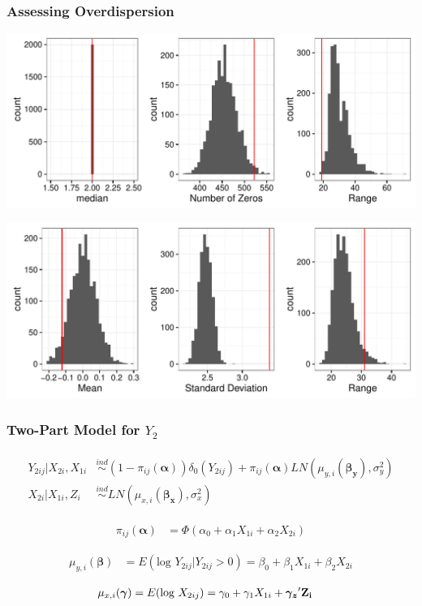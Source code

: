 \documentclass[handout]{beamer}\usepackage[]{graphicx}\usepackage[]{color}
\begin{document}
\begin{frame}
\frametitle{Assessing Overdispersion}

\centering
\includegraphics{y1ppmarg}

\includegraphics{y1ppcond}


\end{frame}

\begin{frame}
\frametitle{Two-Part Model for $Y_2$}

\begin{align*}
\begin{split}
	Y_{2ij}|X_{2i}, X_{1i} &\overset{ind}{\sim} (1-\pi_{ij}(\boldsymbol{\alpha})) \delta_0(Y_{2ij}) + \pi_{ij}(\boldsymbol{\alpha}) LN(\mu_{y,i} (\boldsymbol{\beta_y}), \sigma_y^2)\\
	X_{2i}|X_{1i}, Z_i &\overset{ind}{\sim} LN(\mu_{x,i} (\boldsymbol{\beta_x}), \sigma_x^2)
\end{split}
\end{align*}

\begin{align*}
\pi_{ij}(\boldsymbol{\alpha}) &= \Phi(\alpha_0 + \alpha_1 X_{1i} + \alpha_2 X_{2i}) \end{align*}

\begin{align*}
 \mu_{y,i}(\boldsymbol{\beta}) &=  E(\text{log } Y_{2ij}|Y_{2ij} > 0) = {\beta_0 + \beta_1 X_{1i} + \beta_2 X_{2i}}
 \end{align*} 

\begin{align*}
 \mu_{x,i}(\boldsymbol{\gamma}) &=  E(\text{log } X_{2ij}) = \gamma_0 + \gamma_1 X_{1i} + \boldsymbol{\gamma_z}'{\bf Z_i}  
 \end{align*} 


\end{frame}
\end{document}
